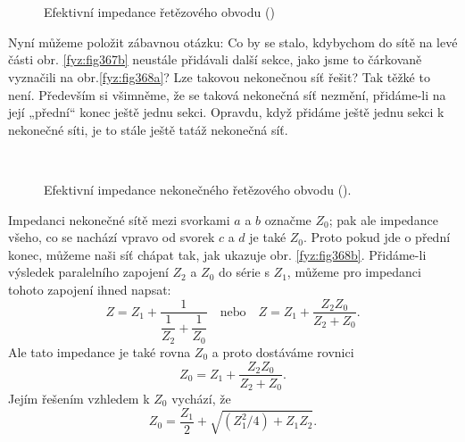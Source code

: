  \begin{figure}[ht!] %
    \centering
       \\
       \\
    \caption{Efektivní impedance řetězového obvodu
             (\cite[s.~407]{Feynman02})}
    \label{fyz:fig367}
  \end{figure}
  
  Nyní můžeme položit zábavnou otázku: Co by se stalo, kdybychom do sítě na levé části obr. 
  \ref{fyz:fig367b} neustále přidávali další sekce, jako jsme to čárkovaně vyznačili na 
  obr.\ref{fyz:fig368a}? Lze takovou nekonečnou síť řešit? Tak těžké to není. Především si 
  všimněme, že se taková nekonečná síť nezmění, přidáme-li na její „přední“ konec ještě jednu 
  sekci. Opravdu, když přidáme ještě jednu sekci k nekonečné síti, je to stále ještě tatáž 
  nekonečná síť.
  
  \begin{figure}[ht!] %
    \centering
       \\
    \caption{Efektivní impedance nekonečného řetězového obvodu
             (\cite[s.~408]{Feynman02}).}
    \label{fyz:fig368}
  \end{figure}

  Impedanci nekonečné sítě mezi svorkami \(a\) a \(b\) označme \(Z_0\); pak ale impedance všeho, co 
  se nachází vpravo od svorek \(c\) a \(d\) je také \(Z_0\). Proto pokud jde o přední konec, můžeme 
  naši síť chápat tak, jak ukazuje obr. \ref{fyz:fig368b}. Přidáme-li výsledek paralelního zapojení 
  \(Z_2\) a \(Z_0\) do série s \(Z_1\), můžeme pro impedanci tohoto zapojení ihned napsat:
  \begin{equation*}
    Z = Z_1 + \dfrac{1}{\dfrac{1}{Z_2}+\dfrac{1}{Z_0}} \quad\text{nebo}\quad
    Z = Z_1 + \dfrac{Z_2Z_0}{Z_2 + Z_0}.
  \end{equation*}
  Ale tato impedance je také rovna \(Z_0\) a proto dostáváme rovnici
  \begin{equation*}
    Z_0 = Z_1 + \dfrac{Z_2Z_0}{Z_2 + Z_0}.
  \end{equation*}
  Jejím řešením vzhledem k \(Z_0\) vychází, že
  \begin{equation}\label{fyz:eq498}
    Z_0 = \dfrac{Z_1}{2} + \sqrt{(Z_1^2/4) + Z_1Z_2}.
  \end{equation}
  
